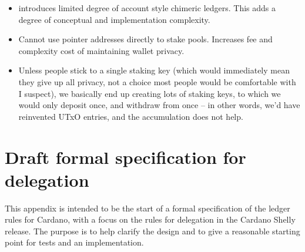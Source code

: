 \documentclass[11pt,a4paper]{article}
\begin{document}
\begin{itemize}
\item
  introduces limited degree of account style chimeric ledgers. This adds
  a degree of conceptual and implementation complexity.
\item
  Cannot use pointer addresses directly to stake pools. Increases fee
  and complexity cost of maintaining wallet privacy.
\item
  Unless people stick to a single staking key (which would immediately
  mean they give up all privacy, not a choice most people would be
  comfortable with I suspect), we basically end up creating lots of
  staking keys, to which we would only deposit once, and withdraw from
  once -- in other words, we'd have reinvented UTxO entries, and the
  accumulation does not help.
\end{itemize}

\section{Draft formal specification for delegation}
\label{formal-specification-for-delegation}

This appendix is intended to be the start of a formal specification of the
ledger rules for Cardano, with a focus on the rules for delegation in the
Cardano Shelly release. The purpose is to help clarify the design and to give
a reasonable starting point for tests and an implementation.

\newcommand{\powerset}[1]{\mathbb{P}(#1)}
\newcommand{\restrictdom}{\lhd}
\newcommand{\subtractdom}{\mathbin{\slashed{\restrictdom}}}
\newcommand{\restrictrange}{\rhd}
\end{document}
